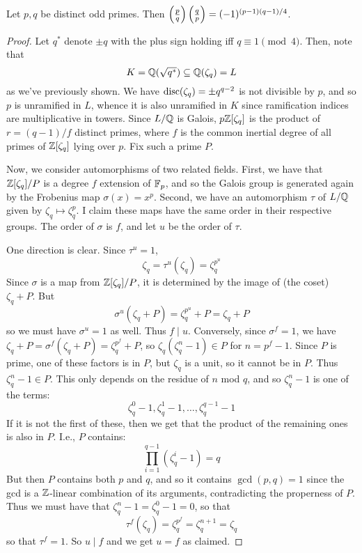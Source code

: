 \begin{thm} Let $p,q$ be distinct odd primes. Then $\left(\frac{p}{q}\right)\left(\frac{q}{p}\right) = (-1)^{(p-1)(q-1)/4}$. \end{thm}
\begin{proof}
	Let $q^\ast$ denote $\pm q$ with the plus sign holding iff $q \equiv 1 \pmod{4}$. Then, note that
	\[ K = \mathbb{Q}(\sqrt{q^\ast}) \subseteq \mathbb{Q}(\zeta_q) = L \]
	as we've previously shown. We have $\operatorname{disc}(\zeta_q) = \pm q^{q-2}$ is not divisible by $p$, and so $p$ is unramified in $L$, whence it is also unramified in $K$ since ramification indices are multiplicative in towers. Since $L/\mathbb{Q}$ is Galois, $p\mathbb{Z}[\zeta_q]$ is the product of $r = (q-1)/f$ distinct primes, where $f$ is the common inertial degree of all primes of $\mathbb{Z}[\zeta_q]$ lying over $p$. Fix such a prime $P$.
	
	Now, we consider automorphisms of two related fields. First, we have that $\mathbb{Z}[\zeta_q]/P$ is a degree $f$ extension of $\mathbb{F}_p$, and so the Galois group is generated again by the Frobenius map $\sigma(x) = x^p$. Second, we have an automorphism $\tau$ of $L/\mathbb{Q}$ given by $\zeta_q \mapsto \zeta_q^p$. I claim these maps have the same order in their respective groups. The order of $\sigma$ is $f$, and let $u$ be the order of $\tau$.
	
	One direction is clear. Since $\tau^u = 1$,
	\[ \zeta_q = \tau^u(\zeta_q) = \zeta_q^{p^u} \]
	Since $\sigma$ is a map from $\mathbb{Z}[\zeta_q]/P$, it is determined by the image of (the coset) $\zeta_q + P$. But
	\[ \sigma^u(\zeta_q + P) = \zeta_q^{p^u} + P = \zeta_q + P \]
	so we must have $\sigma^u = 1$ as well. Thus $f \mid u$. Conversely, since $\sigma^f = 1$, we have $\zeta_q + P = \sigma^f(\zeta_q + P) = \zeta_q^{p^f}+P$, so $\zeta_q(\zeta_q^n-1) \in P$ for $n = p^f-1$. Since $P$ is prime, one of these factors is in $P$, but $\zeta_q$ is a unit, so it cannot be in $P$. Thus $\zeta_q^n-1 \in P$. This only depends on the residue of $n$ mod $q$, and so $\zeta_q^n-1$ is one of the terms:
	\[ \zeta_q^0-1,\zeta_q^1-1,\ldots,\zeta_q^{q-1}-1 \]
	If it is not the first of these, then we get that the product of the remaining ones is also in $P$. I.e., $P$ contains:
	\[ \prod_{i=1}^{q-1} (\zeta_q^i-1) = q \]
	But then $P$ contains both $p$ and $q$, and so it contains $\gcd(p,q) = 1$ since the gcd is a $\mathbb{Z}$-linear combination of its arguments, contradicting the properness of $P$. Thus we must have that $\zeta_q^n-1 = \zeta_q^0-1 = 0$, so that
	\[ \tau^f(\zeta_q) = \zeta_q^{p^f} = \zeta_q^{n+1} = \zeta_q \]
	so that $\tau^f = 1$. So $u \mid f$ and we get $u=f$ as claimed.
	

\end{proof}
